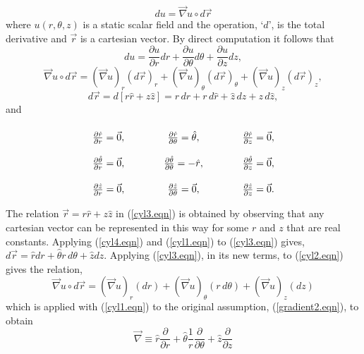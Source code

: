 \documentclass[12pt]{article}
\theoremstyle{definition}
\numberwithin{equation}{section}
\begin{document}
{$$du=\vec{\nabla}u\circ d\vec{r}$$
where $u(r,\theta ,z)$ is a static scalar field and the operation, `$d$', is the total derivative and $\vec{r}$ is a cartesian vector. By direct computation it follows that
\begin{equation}
du=\frac{\partial u}{\partial r}dr+\frac{\partial u}{\partial \theta}d\theta+\frac{\partial u}{\partial z}dz,
\label{cyl1.eqn}
\end{equation}
\begin{equation}
\vec{\nabla}u\circ d\vec{r}=(\vec{\nabla}u)_{r}(d\vec{r})_{r}+(\vec{\nabla}u)_{\theta}(d\vec{r})_{\theta}+(\vec{\nabla}u)_{z}(d\vec{r})_{z},
\label{cyl2.eqn}
\end{equation}
\begin{equation}
d\vec{r}=d[r\hat{r}+z\hat{z}]=\hat{r}\,dr+r\,d\hat{r}+\hat{z}\,dz+z\,d\hat{z},
\label{cyl3.eqn}
\end{equation}
and
\begin{equation}
\arraycolsep=20pt\def\arraystretch{2.2}
\begin{array}{ccc}\frac{\partial\hat{r}}{\partial r}=\vec{0}, & \frac{\partial\hat{r}}{\partial\theta}=\hat{\theta}, & \frac{\partial\hat{r}}{\partial z}=\vec{0},\\ \frac{\partial\hat{\theta}}{\partial r}=\vec{0}, & \frac{\partial\hat{\theta}}{\partial\theta}=-\hat{r}, & \frac{\partial\hat{\theta}}{\partial z}=\vec{0},\\ \frac{\partial\hat{z}}{\partial r}=\vec{0}, & \frac{\partial\hat{z}}{\partial\theta}=\vec{0}, & \frac{\partial\hat{z}}{\partial z}=\vec{0}.\end{array}
\label{cyl4.eqn}
\end{equation}
The relation $\vec{r}=r\hat{r}+z\hat{z}$ in (\ref{cyl3.eqn}) is obtained by observing that any cartesian vector can be represented in this way for some $r$ and $z$ that are real constants. Applying (\ref{cyl4.eqn}) and (\ref{cyl1.eqn}) to (\ref{cyl3.eqn}) gives, $d\vec{r}=\hat{r}dr+\hat{\theta}r\,d\theta+\hat{z}dz$. Applying (\ref{cyl3.eqn}), in its new terms, to (\ref{cyl2.eqn}) gives the relation,
\begin{equation}
\vec{\nabla}u\circ d\vec{r}=(\vec{\nabla}u)_{r}(dr)+(\vec{\nabla}u)_{\theta}(r\,d\theta)+(\vec{\nabla}u)_{z}(dz)
\end{equation}
which is applied with (\ref{cyl1.eqn}) to the original assumption, (\ref{gradient2.eqn}), to obtain
\begin{equation}
\vec{\nabla}\equiv \hat{r}\frac{\partial}{\partial r} + \hat{\theta}\frac{1}{r}\frac{\partial}{\partial\theta}+\hat{z}\frac{\partial}{\partial z}

\end{equation}}
\end{document}
